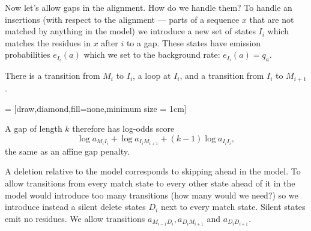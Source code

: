 \documentclass[11pt]{article}
\begin{document}

Now let's allow gaps in the alignment.  How do we handle them?  To handle an insertions (with respect to the alignment --- parts of a sequence $x$ that are not matched by anything in the model) we introduce a new set of states $I_i$ which matches the residues in $x$ after $i$ to a gap.  These states have emission probabilities  $e_{I_i}(a)$ which we set to the background rate:  $e_{I_i}(a) = q_a$.

There is a transition from $M_i$ to $I_i$, a loop at $I_i$, and a transition from $I_i$ to $M_{i+1}$.  

 = [draw,diamond,fill=none,minimum size = 1cm]

A gap of length $k$ therefore has log-odds score 
\[ \log a_{M_iI_i} + \log a_{I_i M_{i+1}} + (k-1)\log a_{I_iI_i}, \] 
the same as an affine gap penalty.

A deletion relative to the model corresponds to skipping ahead in the model.  To allow transitions from every match state to every other state ahead of it in the model would introduce too many transitions (how many would we need?) so we introduce instead a silent delete states $D_i$ next to every match state.  Silent states emit no residues.    We allow transitions $a_{M_{i-1}D_i}, a_{D_{i}M_{i+1}}$ and $a_{D_{i}D_{i+1}}$.  
\end{document}
